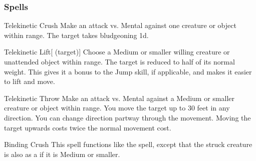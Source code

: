 \subsubsection{Spells}


\lowercase{\hypertarget{spell:Telekinetic Crush}{}}\label{spell:Telekinetic Crush}
\begin{freeability}[\nth{1}]{\hypertarget{spell:Telekinetic Crush}{Telekinetic Crush}}
Make an attack vs. Mental against one creature or object within \rngmed range.
\hit The target takes bludgeoning  \plus1d.
\end{freeability}
\vspace{0.25em}



\lowercase{\hypertarget{spell:Telekinetic Lift}{}}\label{spell:Telekinetic Lift}
\begin{attuneability}[\nth{1}]{\hypertarget{spell:Telekinetic Lift}{Telekinetic Lift}}[ (target)]
Choose a Medium or smaller willing creature or unattended object within \rngclose range.
The target is reduced to half of its normal weight.
This gives it a  bonus to the Jump skill, if applicable, and makes it easier to lift and move.
\end{attuneability}
\vspace{0.25em}



\lowercase{\hypertarget{spell:Telekinetic Throw}{}}\label{spell:Telekinetic Throw}
\begin{freeability}[\nth{1}]{\hypertarget{spell:Telekinetic Throw}{Telekinetic Throw}}
Make an attack vs. Mental against a Medium or smaller creature or object within \rngmed range.
\hit You move the target up to 30 feet in any direction.
You can change direction partway through the movement.
Moving the target upwards costs twice the normal movement cost.
\end{freeability}
\vspace{0.25em}



\lowercase{\hypertarget{spell:Binding Crush}{}}\label{spell:Binding Crush}
\begin{freeability}[\nth{3}]{\hypertarget{spell:Binding Crush}{Binding Crush}}
This spell functions like the  spell, except that the struck creature is also  as a  if it is Medium or smaller.
\end{freeability}
\vspace{0.25em}



